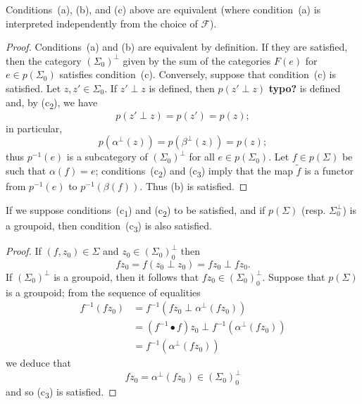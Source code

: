\documentclass[a4paper,fleqn]{article}
\theoremstyle{plain}
\newenvironment{proposition}[1]
  {\renewcommand\theinnerproposition{#1}\innerproposition}
  {\endinnerproposition}
\newenvironment{corollary}[1]
  {\renewcommand\theinnercorollary{#1}\innercorollary}
  {\endinnercorollary}
\theoremstyle{definition}
\newcommand{\unsure}[1]{{\color{purple}\textbf{#1}}}
\newcommand{\FF}{\mathcal{F}}
\begin{document}
\begin{proposition}{1}
\label{proposition:i-1}
  Conditions~(a), (b), and (c) above are equivalent (where condition~(a) is interpreted independently from the choice of $\FF$).
\end{proposition}

\begin{proof}
  Conditions~(a) and (b) are equivalent by definition.
  If they are satisfied, then the category $(\Sigma_0)^\perp$ given by the sum of the categories $F(e)$ for $e\in p(\Sigma_0)$ satisfies condition~(c).
  Conversely, suppose that condition~(c) is satisfied.
  Let $z,z'\in\Sigma_0$.
  If $z'\perp z$ is defined, then $p(z'\perp z)$ \unsure{typo?} is defined and, by (c\textsubscript{2}), we have
  \[
    p(z'\perp z)
    = p(z')
    = p(z);
  \]
  in particular,
  \[
    p(\alpha^\perp(z))
    = p(\beta^\perp(z))
    = p(z);
  \]
  thus $p^{-1}(e)$ is a subcategory of $(\Sigma_0)^\perp$ for all $e\in p(\Sigma_0)$.
  Let $f\in p(\Sigma)$ be such that $\alpha(f)=e$;
  conditions~(c\textsubscript{2}) and (c\textsubscript{3}) imply that the map $\widetilde{f}$ is a functor from $p^{-1}(e)$ to $p^{-1}(\beta(f))$.
  Thus (b) is satisfied.
\end{proof}

\begin{corollary}{}
  If we suppose conditions~(c\textsubscript{1}) and (c\textsubscript{2}) to be satisfied, and if $p(\Sigma)$ (resp. $\Sigma_0^\perp$) is a groupoid, then condition~(c\textsubscript{3}) is also satisfied.
\end{corollary}

\begin{proof}
  If $(f,z_0)\in\Sigma$ and $z_0\in(\Sigma_0)_0^\perp$ then
  \[
    fz_0
    = f(z_0\perp z_0)
    =fz_0\perp fz_0.
  \]
  If $(\Sigma_0)^\perp$ is a groupoid, then it follows that $fz_0\in(\Sigma_0)_0^\perp$.
  Suppose that $p(\Sigma)$ is a groupoid;
  from the sequence of equalities
  \[
    \begin{aligned}
      f^{-1}(fz_0)
      &= f^{-1}(fz_0\perp\alpha^\perp(fz_0))
    \\&= (f^{-1}\bullet f)z_0\perp f^{-1}(\alpha^\perp(fz_0))
    \\&= f^{-1}(\alpha^\perp(fz_0))
    \end{aligned}
  \]
  we deduce that
  \[
    fz_0
    = \alpha^\perp(fz_0)
    \in(\Sigma_0)_0^\perp
  \]
  and so (c\textsubscript{3}) is satisfied.
\end{proof}
\end{document}
